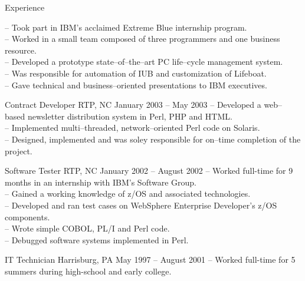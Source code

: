 \documentclass[letterpaper, 11pt]{article}
\begin{document}
\begin{resume}
\begin{category}{Experience}
\begin{block}
                -- Took part in IBM's acclaimed Extreme Blue internship program.                    \\
                -- Worked in a small team composed of three programmers and one business resource.  \\
                -- Developed a prototype state--of--the--art PC life--cycle management system.      \\
                -- Was responsible for automation of IUB and customization of Lifeboat.             \\
                -- Gave technical and business--oriented presentations to IBM executives.
            \end{block}
            \begin{block}
                           {Contract Developer}
                         {RTP, NC}                  {January 2003 -- May 2003}
                -- Developed a web--based newsletter distribution system in Perl, PHP and HTML.            \\
                -- Implemented multi--threaded, network--oriented Perl code on Solaris.                    \\
                -- Designed, implemented and was soley responsible for on--time completion of the project.
            \end{block}
            \begin{block}
                                      {Software Tester}
                         {RTP, NC}                  {January 2002 -- August 2002}
                -- Worked full-time for 9 months in an internship with IBM's Software Group.            \\
                -- Gained a working knowledge of z/OS and associated technologies.                      \\
                -- Developed and ran test cases on WebSphere Enterprise Developer's z/OS components.    \\
                -- Wrote simple COBOL, PL/I and Perl code.                                              \\
                -- Debugged software systems implemented in Perl.
            \end{block}
            \begin{block}
                 {IT Technician}
                         {Harrisburg, PA}            {May 1997 -- August 2001}
                -- Worked full-time for 5 summers during high-school and early college.             \\

\end{block}
\end{category}
\end{resume}
\end{document}
